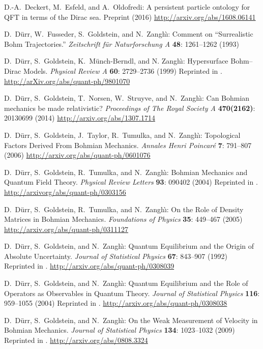 \documentclass[12pt]{article}
\begin{document}
\begin{thebibliography}{20}
 D.-A.~Deckert, M.~Esfeld, and A.~Oldofredi:
	A persistent particle ontology for QFT in terms of the 
	Dirac sea.
	Preprint (2016)
	\url{http://arxiv.org/abs/1608.06141}

 D.~D\"urr, W.~Fusseder, S.~Goldstein, and N.~Zangh\`\i:
	Comment on ``Surrealistic Bohm Trajectories.''
	{\it Zeitschrift f\"ur Naturforschung A} {\bf 48}: 1261--1262 (1993)

 D.~D\"urr, S.~Goldstein, K.~M\"unch-Berndl, and N. Zangh\`\i: 
	Hypersurface Bohm--Dirac Models. 
	\textit{Physical Review A} \textbf{60}: 2729--2736 (1999)
	Reprinted in \cite{DGZ13}. 
	\url{http://arXiv.org/abs/quant-ph/9801070}

 D.~D\"urr, S.~Goldstein, T.~Norsen, W.~Struyve, and N.~Zangh\`\i:
	Can Bohmian mechanics be made relativistic?
	\textit{Proceedings of The Royal Society A} \textbf{470(2162)}: 20130699 (2014)
	\url{http://arxiv.org/abs/1307.1714}

 D.~D{\"u}rr, S.~Goldstein, J.~Taylor, R.~Tumulka, and N.~Zangh{\`{\i}}:  
	Topological Factors Derived From Bohmian Mechanics. 
	\textit{Annales Henri Poincar\'e} {\bf 7}: 791--807 (2006)
	\url{http://arxiv.org/abs/quant-ph/0601076}

 D.~D{\"u}rr, S.~Goldstein, R.~Tumulka, and N.~Zangh{\`{\i}}: 
	Bohmian Mechanics and Quantum Field Theory.
	\textit{Physical Review Letters} \textbf{93}: 090402 (2004)
	Reprinted in \cite{DGZ13}. 
	\url{http://arxivorg/abs/quant-ph/0303156}

 D.~D\"urr, S.~Goldstein, R.~Tumulka, and N.~Zangh\`\i:
	On the Role of Density Matrices in Bohmian Mechanics.
	\textit{Foundations of Physics} \textbf{35}: 449--467 (2005)
	\url{http://arxiv.org/abs/quant-ph/0311127}

 D.~D\"urr, S.~Goldstein, and N.~Zangh\`\i: 
	Quantum Equilibrium and the Origin of Absolute Uncertainty. 
	\textit{Journal of Statistical Physics} \textbf{67}: 843--907 (1992)
	Reprinted in \cite{DGZ13}. 
	\url{http://arxiv.org/abs/quant-ph/0308039}

 D.~D\"urr, S.~Goldstein, and N.~Zangh\`\i: 
	Quantum Equilibrium and the Role of Operators as Observables in Quantum Theory.
	{\it Journal of Statistical Physics} {\bf 116}: 959--1055 (2004)
	Reprinted in \cite{DGZ13}. 
	\url{http://arxiv.org/abs/quant-ph/0308038}

 D.~D\"urr, S.~Goldstein, and N.~Zangh\`\i: 
	On the Weak Measurement of Velocity in Bohmian Mechanics.
	{\it Journal of Statistical Physics} {\bf 134}: 1023--1032 (2009)
	Reprinted in \cite{DGZ13}. 
	\url{http://arxiv.org/abs/0808.3324}


\end{thebibliography}
\end{document}
